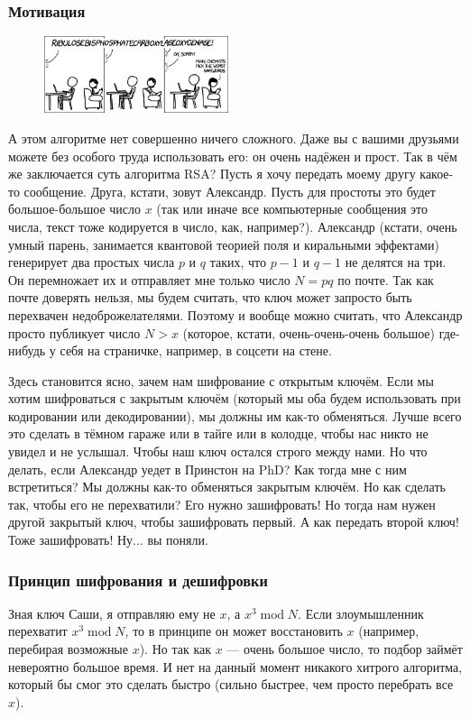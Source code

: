 \documentclass[12pt]{article}
\begin{document}
\subsubsection*{Мотивация}
\begin{figure}
  \begin{center}
    \includegraphics[width=0.48\textwidth]{cryptojoke.png}
  \end{center}
\end{figure}
А этом алгоритме нет совершенно ничего сложного. Даже вы с вашими друзьями можете без особого труда использовать его: он очень надёжен и прост. Так в чём же заключается суть алгоритма RSA? Пусть я хочу передать моему другу какое-то сообщение. Друга, кстати, зовут Александр. Пусть для простоты это будет большое-большое число $x$ (так или иначе все компьютерные сообщения это числа, текст тоже кодируется в число, как, например?). Александр (кстати, очень умный парень, занимается квантовой теорией поля и киральными эффектами) генерирует два простых числа $p$ и $q$ таких, что $p - 1$ и $q - 1$ не делятся на три. Он перемножает их и отправляет мне только число $N = pq$ по почте. Так как почте доверять нельзя, мы будем считать, что ключ может запросто быть перехвачен недоброжелателями. Поэтому и вообще можно считать, что Александр просто публикует число $N > x$ (которое, кстати, очень-очень-очень большое) где-нибудь у себя на страничке, например, в соцсети на стене.

Здесь становится ясно, зачем нам шифрование с открытым ключём. Если мы хотим шифроваться с закрытым ключём (который мы оба будем использовать при кодировании или декодировании), мы должны им как-то обменяться. Лучше всего это сделать в тёмном гараже или в тайге или в колодце, чтобы нас никто не увидел и не услышал. Чтобы наш ключ остался строго между нами. Но что делать, если Александр уедет в Принстон на PhD? Как тогда мне с ним встретиться? Мы должны как-то обменяться закрытым ключём. Но как сделать так, чтобы его не перехватили? Его нужно зашифровать! Но тогда нам нужен другой закрытый ключ, чтобы зашифровать первый. А как передать второй ключ! Тоже зашифровать! Ну... вы поняли.

\subsubsection*{Принцип шифрования и дешифровки}
Зная ключ Саши, я отправляю ему не $x$, а $x^3\;\mbox{mod}\;N$. Если злоумышленник перехватит $x^3\;\mbox{mod}\;N$, то в принципе он может восстановить $x$ (например, перебирая возможные $x$). Но так как $x$ --- очень большое число, то подбор займёт невероятно большое время. И нет на данный момент никакого хитрого алгоритма, который бы смог это сделать быстро (сильно быстрее, чем просто перебрать все $x$).
\end{document}
